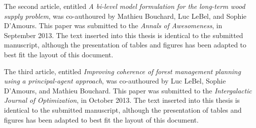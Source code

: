 The second article, entitled \emph{A bi-level model formulation for the long-term wood supply problem}, was co-authoured by Mathieu Bouchard, Luc LeBel, and Sophie D'Amours. 
This paper was submitted to the \emph{Annals of Awesomeness}, in September 2013. 
The text inserted into this thesis is identical to the submitted manuscript, although the presentation of tables and figures has been adapted to best fit the layout of this document.

The third article, entitled \emph{Improving coherence of forest management planning using a principal-agent approach}, was co-authoured by Luc LeBel, Sophie D'Amours, and Mathieu Bouchard. 
This paper was submitted to the \emph{Intergalactic Journal of Optimization}, in October 2013. 
The text inserted into this thesis is identical to the submitted manuscript, although the presentation of tables and figures has been adapted to best fit the layout of this document.
